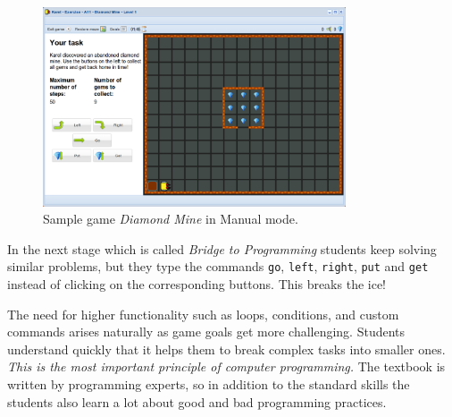 \documentclass[article,A4,12pt]{llncs}
\begin{document}
\begin{figure}[!ht]
\begin{center}
\includegraphics[width=0.8\textwidth]{imgk/fore-1.png}
\end{center}
\vspace{-2mm}
\caption{Sample game {\em Diamond Mine} in Manual mode.}
\label{fig:f1}
\vspace{-4mm}
\end{figure}
\noindent
In the next stage which is called {\em Bridge to Programming} students keep solving 
similar problems, but they type the commands 
{\tt go}, {\tt left}, {\tt right}, {\tt put} and {\tt get} instead of clicking on the 
corresponding buttons. This breaks the ice!

The need for higher functionality such as loops, conditions, and custom commands arises 
naturally as game goals get more challenging. 
Students understand quickly that it helps them to break complex tasks into smaller 
ones. {\em This is the most important principle of computer 
programming.} The textbook is written by programming experts, so in addition to the 
standard skills the students also learn a lot about good and bad programming practices.
\end{document}
